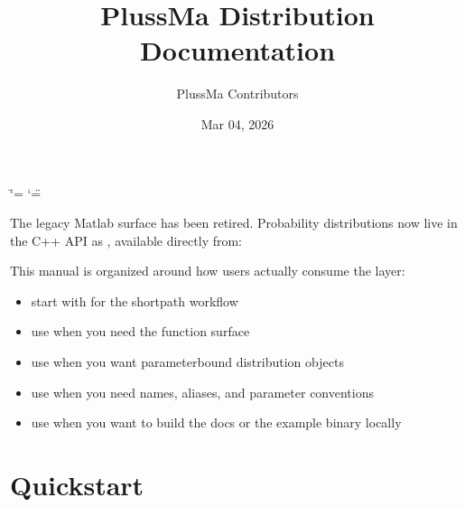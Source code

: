 \documentclass[letterpaper,10pt,english]{sphinxmanual}
\title{PlussMa Distribution Documentation}
\date{Mar 04, 2026}
\author{PlussMa Contributors}
\begin{document}
\ifdefined\shorthandoff
  \ifnum\catcode`\=\string=\active\shorthandoff{=}\fi
  \ifnum\catcode`\"=\active{}\fi
\fi

\pagestyle{empty}
\sphinxmaketitle
\pagestyle{plain}
\sphinxtableofcontents
\pagestyle{normal}
\label{\detokenize{index::doc}}


\sphinxAtStartPar
The legacy Matlab  surface has been retired. Probability distributions now live in the C++ API as , available directly from:

\begin{sphinxVerbatim}[commandchars=\\\{\}]
\end{sphinxVerbatim}

\sphinxAtStartPar
This manual is organized around how users actually consume the layer:
\begin{itemize}
\item {} 
\sphinxAtStartPar
start with  for the short\sphinxhyphen{}path workflow

\item {} 
\sphinxAtStartPar
use  when you need the function surface

\item {} 
\sphinxAtStartPar
use  when you want parameter\sphinxhyphen{}bound distribution objects

\item {} 
\sphinxAtStartPar
use  when you need names, aliases, and parameter conventions

\item {} 
\sphinxAtStartPar
use  when you want to build the docs or the example binary locally

\end{itemize}

\sphinxstepscope


\chapter{Quickstart}
\label{\detokenize{quickstart:quickstart}}\label{\detokenize{quickstart::doc}}
\end{document}
